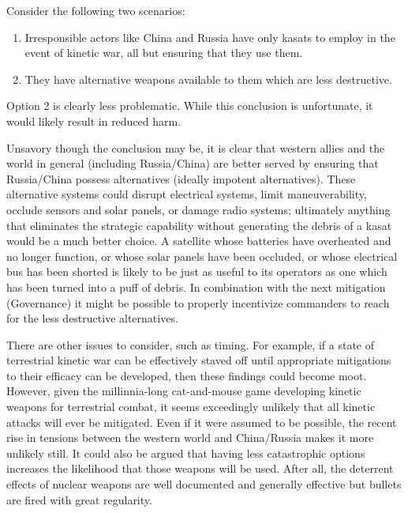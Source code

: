 Consider the following two scenarios:

\begin{enumerate}
\item Irresponsible actors like China and Russia have only \acp{kasat}
  to employ in the event of kinetic war, all but ensuring that they
  use them.

\item They have alternative weapons available to them which are less
  destructive.
\end{enumerate}

Option 2 is clearly less problematic.  While this conclusion is
unfortunate, it would likely result in reduced harm.

Unsavory though the conclusion may be, it is clear that western allies
and the world in general (including Russia/China) are better served by
ensuring that Russia/China possess alternatives (ideally impotent
alternatives).  These alternative systems could disrupt electrical
systems, limit maneuverability, occlude sensors and solar panels, or
damage radio systems; ultimately anything that eliminates the
strategic capability without generating the debris of a \ac{kasat}
would be a much better choice.  A satellite whose batteries have
overheated and no longer function, or whose solar panels have been
occluded, or whose electrical bus has been shorted is likely to be
just as useful to its operators as one which has been turned into a
puff of debris.  In combination with the next mitigation (Governance)
it might be possible to properly incentivize commanders to reach for
the less destructive alternatives.

There are other issues to consider, such as timing.  For example, if a
state of terrestrial kinetic war can be effectively staved off until
appropriate mitigations to their efficacy can be developed, then these
findings could become moot.  However, given the millinnia-long
cat-and-mouse game developing kinetic weapons for terrestrial combat,
it seems exceedingly unlikely that all kinetic attacks will ever be
mitigated.  Even if it were assumed to be possible, the recent rise in
tensions between the western world and China/Russia makes it more
unlikely still. It could also be argued that having less catastrophic
options increases the likelihood that those weapons will be used.
After all, the deterrent effects of nuclear weapons are well
documented and generally effective\cite[mad]{xxx} but bullets are
fired with great regularity.


